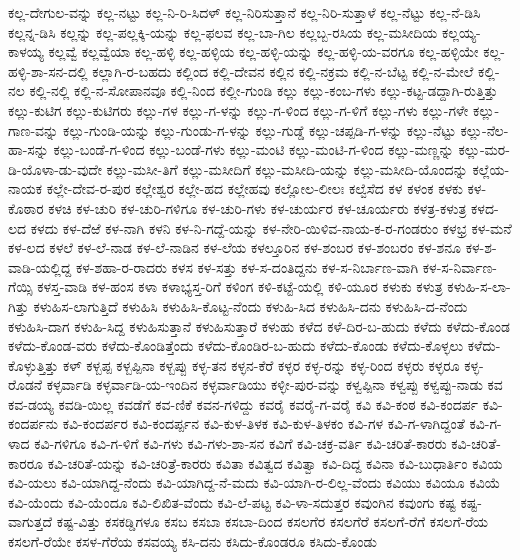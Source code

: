 ಕಲ್ಲ-ದೇಗುಲ-ವನ್ನು
ಕಲ್ಲ-ನಟ್ಟು
ಕಲ್ಲ-ನಿ-ರಿ-ಸಿದಳ್
ಕಲ್ಲ-ನಿರಿಸುತ್ತಾನೆ
ಕಲ್ಲ-ನಿರಿ-ಸುತ್ತಾಳೆ
ಕಲ್ಲ-ನೆಟ್ಟು
ಕಲ್ಲ-ನೆ-ಡಿಸಿ
ಕಲ್ಲನ್ನ-ಡಿಸಿ
ಕಲ್ಲನ್ನು
ಕಲ್ಲ-ಪಲ್ಲಕ್ಕಿ-ಯನ್ನು
ಕಲ್ಲ-ಫಲವ
ಕಲ್ಲ-ಬಾ-ಗಿಲ
ಕಲ್ಲಬ್ಬ-ರಸಿಯ
ಕಲ್ಲ-ಮಸೀದಿಯ
ಕಲ್ಲಯ್ಯ-ಕಾಳಯ್ಯ
ಕಲ್ಲವ್ವೆ
ಕಲ್ಲವ್ವೆಯಾ
ಕಲ್ಲ-ಹಳ್ಳಿ
ಕಲ್ಲ-ಹಳ್ಳಿಯ
ಕಲ್ಲ-ಹಳ್ಳಿ-ಯನ್ನು
ಕಲ್ಲ-ಹಳ್ಳಿ-ಯ-ವರಗೂ
ಕಲ್ಲ-ಹಳ್ಳಿಯೇ
ಕಲ್ಲ-ಹಳ್ಳಿ-ಶಾ-ಸನ-ದಲ್ಲಿ
ಕಲ್ಲಾಗಿ-ರ-ಬಹದು
ಕಲ್ಲಿಂದ
ಕಲ್ಲಿ-ದೇವನ
ಕಲ್ಲಿನ
ಕಲ್ಲಿ-ನಕ್ರಮ
ಕಲ್ಲಿ-ನ-ಬೆಟ್ಟ
ಕಲ್ಲಿ-ನ-ಮೇಲೆ
ಕಲ್ಲಿ-ನಲ
ಕಲ್ಲಿ-ನಲ್ಲಿ
ಕಲ್ಲಿ-ನ-ಸೋಪಾನವೂ
ಕಲ್ಲಿ-ನಿಂದ
ಕಲ್ಲೀ-ಗುಂಡಿ
ಕಲ್ಲು
ಕಲ್ಲು-ಕಂಬ-ಗಳು
ಕಲ್ಲು-ಕಟ್ಟ-ಡದ್ದಾಗಿ-ರುತ್ತಿತ್ತು
ಕಲ್ಲು-ಕುಟಿಗ
ಕಲ್ಲು-ಕುಟಿಗರು
ಕಲ್ಲು-ಗಳ
ಕಲ್ಲು-ಗ-ಳನ್ನು
ಕಲ್ಲು-ಗ-ಳಿಂದ
ಕಲ್ಲು-ಗ-ಳಿಗೆ
ಕಲ್ಲು-ಗಳು
ಕಲ್ಲು-ಗಳೇ
ಕಲ್ಲು-ಗಾಣ-ವನ್ನು
ಕಲ್ಲು-ಗುಂಡಿ-ಯನ್ನು
ಕಲ್ಲು-ಗುಂಡು-ಗ-ಳನ್ನು
ಕಲ್ಲು-ಗುಡ್ಡೆ
ಕಲ್ಲು-ಚಪ್ಪಡಿ-ಗ-ಳನ್ನು
ಕಲ್ಲು-ನೆಟ್ಟು
ಕಲ್ಲು-ನೆಲ-ಹಾ-ಸನ್ನು
ಕಲ್ಲು-ಬಂಡೆ-ಗ-ಳಿಂದ
ಕಲ್ಲು-ಬಂಡೆ-ಗಳು
ಕಲ್ಲು-ಮಂಟಿ
ಕಲ್ಲು-ಮಂಟಿ-ಗ-ಳಿಂದ
ಕಲ್ಲು-ಮಣ್ಣನ್ನು
ಕಲ್ಲು-ಮರ-ಡಿ-ಯೊಳಾ-ಡು-ವುದೇ
ಕಲ್ಲು-ಮಸೀ-ತಿಗೆ
ಕಲ್ಲು-ಮಸೀದಿಗೆ
ಕಲ್ಲು-ಮಸೀದಿ-ಯನ್ನು
ಕಲ್ಲು-ಮಸೀದಿ-ಯೊಂದನ್ನು
ಕಲ್ಲೆಯ-ನಾಯಕ
ಕಲ್ಲೇ-ದೇವ-ರ-ಪುರ
ಕಲ್ಲೇಶ್ವರ
ಕಲ್ಲೇ-ಹದ
ಕಲ್ಲೇಹವು
ಕಲ್ಲೋಲ-ಲೀಲಃ
ಕಲ್ವೆಸೆದ
ಕಳ
ಕಳಂಕ
ಕಳಕು
ಕಳ-ಕೊಠಾರ
ಕಳಚಿ
ಕಳ-ಚುರಿ
ಕಳ-ಚುರಿ-ಗಳಿಗೂ
ಕಳ-ಚುರಿ-ಗಳು
ಕಳ-ಚುರ್ಯರ
ಕಳ-ಚೂರ್ಯರು
ಕಳತ್ರ-ಕಳುತ್ರ
ಕಳದ-ಲದ
ಕಳದು
ಕಳ-ದೆಱೆ
ಕಳ-ನಾಗಿ
ಕಳನಿ
ಕಳ-ನಿ-ಗದ್ದೆ-ಯನ್ನು
ಕಳ-ನೇರಿ-ಯಿಳಿವ-ನಾಯ-ಕ-ರ-ಗಂಡರುಂ
ಕಳಭ್ರ
ಕಳ-ಮನೆ
ಕಳ-ಲದ
ಕಳಲೆ
ಕಳ-ಲೆ-ನಾಡ
ಕಳ-ಲೆ-ನಾಡಿನ
ಕಳ-ಲೆಯ
ಕಳಲ್ತೂರಿನ
ಕಳ-ಶಂಬರ
ಕಳ-ಶಂಬರಂ
ಕಳ-ಶನೂ
ಕಳ-ಶ-ವಾಡಿ-ಯಲ್ಲಿದ್ದ
ಕಳ-ಶಹಾ-ರ-ರಾದರು
ಕಳಸ
ಕಳ-ಸತ್ತು
ಕಳ-ಸ-ದಂತಿದ್ದನು
ಕಳ-ಸ-ನಿರ್ಬಾಣ-ವಾಗಿ
ಕಳ-ಸ-ನಿರ್ವಾಣ-ಗೆಯ್ಸಿ
ಕಳಸ್ತ-ವಾಡಿ
ಕಳ-ಹಂಸ
ಕಳಾ
ಕಳಾಭ್ಯಸ್ತ-ರಿಗೆ
ಕಳಿಂಗ
ಕಳಿ-ಕಟ್ಟೆ-ಯಲ್ಲಿ
ಕಳಿ-ಯೂರ
ಕಳುಕು
ಕಳುತ್ರ
ಕಳುಹಿ-ಸ-ಲಾ-ಗಿತ್ತು
ಕಳುಹಿಸ-ಲಾಗುತ್ತಿದೆ
ಕಳುಹಿಸಿ
ಕಳುಹಿಸಿ-ಕೊಟ್ಟ-ನೆಂದು
ಕಳುಹಿ-ಸಿದ
ಕಳುಹಿಸಿ-ದನು
ಕಳುಹಿಸಿ-ದ-ನೆಂದು
ಕಳುಹಿಸಿ-ದಾಗ
ಕಳುಹಿ-ಸಿದ್ದ
ಕಳುಹಿಸುತ್ತಾನೆ
ಕಳುಹಿಸುತ್ತಾರೆ
ಕಳುಹು
ಕಳೆದ
ಕಳೆ-ದಿರ-ಬ-ಹುದು
ಕಳೆದು
ಕಳೆದು-ಕೊಂಡ
ಕಳೆದು-ಕೊಂಡ-ವರು
ಕಳೆದು-ಕೊಂಡಿತ್ತೆಂದು
ಕಳೆದು-ಕೊಂಡಿರ-ಬ-ಹುದು
ಕಳೆದು-ಕೊಂಡು
ಕಳೆದು-ಕೊಳ್ಳಲು
ಕಳೆದು-ಕೊಳ್ಳುತ್ತಿತ್ತು
ಕಳ್
ಕಳ್ಬಪ್ಪ
ಕಳ್ಬಪ್ಪಿನಾ
ಕಳ್ಬಪ್ಪು
ಕಳ್ಳ-ತನ
ಕಳ್ಳನ-ಕೆರೆ
ಕಳ್ಳರ
ಕಳ್ಳ-ರನ್ನು
ಕಳ್ಳ-ರಿಂದ
ಕಳ್ಳರು
ಕಳ್ಳರೂ
ಕಳ್ಳ-ರೊಡನೆ
ಕಳ್ಳರ್ವಾಡಿ
ಕಳ್ಳರ್ವಾಡಿ-ಯ-ಇಂದಿನ
ಕಳ್ಳರ್ವಾಡಿಯು
ಕಳ್ಳೀ-ಪುರ-ವನ್ನು
ಕಳ್ವಪ್ಪಿನಾ
ಕಳ್ವಪ್ಪು
ಕಳ್ವಪ್ಪು-ನಾಡು
ಕವ
ಕವ-ಡಯ್ಯ
ಕವಡಿ-ಯಿಲ್ಲ
ಕವಡೆಗೆ
ಕವ-ಣಿಕೆ
ಕವನ-ಗಳಿದ್ದು
ಕವರೈ
ಕವರೈ-ಗ-ವರೈ
ಕವಿ
ಕವಿ-ಕಂಠ
ಕವಿ-ಕಂದರ್ಪ
ಕವಿ-ಕಂದರ್ಪನು
ಕವಿ-ಕಂದರ್ಪರ
ಕವಿ-ಕಂದರ್ಪ್ಪನ
ಕವಿ-ಕುಳ-ತಿಳಕ
ಕವಿ-ಕುಳ-ತಿಳಕಂ
ಕವಿ-ಗಳ
ಕವಿ-ಗ-ಳಾಗಿದ್ದಂತೆ
ಕವಿ-ಗ-ಳಾದ
ಕವಿ-ಗಳಿಗೂ
ಕವಿ-ಗ-ಳಿಗೆ
ಕವಿ-ಗಳು
ಕವಿ-ಗಳು-ಶಾ-ಸನ
ಕವಿಗೆ
ಕವಿ-ಚಕ್ರ-ವರ್ತಿ
ಕವಿ-ಚರಿತೆ-ಕಾರರು
ಕವಿ-ಚರಿತೆ-ಕಾರರೂ
ಕವಿ-ಚರಿತೆ-ಯನ್ನು
ಕವಿ-ಚರಿತ್ರೆ-ಕಾರರು
ಕವಿತಾ
ಕವಿತ್ವದ
ಕವಿತ್ವಾ
ಕವಿ-ದಿದ್ದ
ಕವಿನಾ
ಕವಿ-ಬುಧಾರ್ತಿಂ
ಕವಿಯ
ಕವಿ-ಯಲು
ಕವಿ-ಯಾಗಿದ್ದ-ನೆಂದು
ಕವಿ-ಯಾಗಿದ್ದ-ನೆ-ಮದು
ಕವಿ-ಯಾಗಿ-ರ-ಲಿಲ್ಲ-ವೆಂದು
ಕವಿಯು
ಕವಿಯೂ
ಕವಿಯೆ
ಕವಿ-ಯೆಂದು
ಕವಿ-ಯೆಂದೂ
ಕವಿ-ಲಿಖಿತ-ವೆಂದು
ಕವಿ-ಲೆ-ಪಟ್ಟ
ಕವಿ-ಳಾ-ಸದುತ್ತರ
ಕವುಂಗಿನ
ಕವುಂಗು
ಕಷ್ಟ
ಕಷ್ಟ-ವಾಗುತ್ತದೆ
ಕಷ್ಟ-ವಿತ್ತು
ಕಸಕಡ್ಡಿಗಳೂ
ಕಸಬ
ಕಸಬಾ
ಕಸಬಾ-ದಿಂದ
ಕಸಲಗೆರ
ಕಸಲಗೆರೆ
ಕಸಲಗೆ-ರೆಗೆ
ಕಸಲಗೆ-ರೆಯ
ಕಸಲಗೆ-ರೆಯೇ
ಕಸಳ-ಗೆರೆಯ
ಕಸವಯ್ಯ
ಕಸಿ-ದನು
ಕಸಿದು-ಕೊಂಡರೂ
ಕಸಿದು-ಕೊಂಡು
